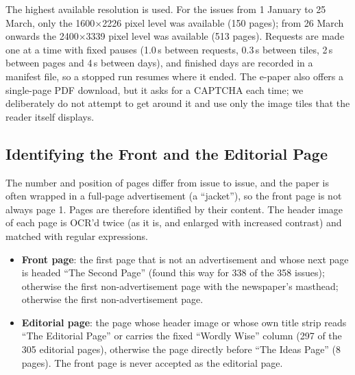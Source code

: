The highest available resolution is used. For the issues from 1 January to 25 March, only the 1600$\times$2226 pixel level was available (150 pages); from 26 March onwards the 2400$\times$3339 pixel level was available (513 pages). Requests are made one at a time with fixed pauses (1.0\,s between requests, 0.3\,s between tiles, 2\,s between pages and 4\,s between days), and finished days are recorded in a manifest file, so a stopped run resumes where it ended. The e-paper also offers a single-page PDF download, but it asks for a CAPTCHA each time; we deliberately do not attempt to get around it and use only the image tiles that the reader itself displays.

\subsection{Identifying the Front and the Editorial Page}
The number and position of pages differ from issue to issue, and the paper is often wrapped in a full-page advertisement (a ``jacket''), so the front page is not always page 1. Pages are therefore identified by their content. The header image of each page is OCR'd twice (as it is, and enlarged with increased contrast) and matched with regular expressions.
\begin{itemize}
\item \textbf{Front page}: the first page that is not an advertisement and whose next page is headed ``The Second Page'' (found this way for 338 of the 358 issues); otherwise the first non-advertisement page with the newspaper's masthead; otherwise the first non-advertisement page.
\item \textbf{Editorial page}: the page whose header image or whose own title strip reads ``The Editorial Page'' or carries the fixed ``Wordly Wise'' column (297 of the 305 editorial pages), otherwise the page directly before ``The Ideas Page'' (8 pages). The front page is never accepted as the editorial page.
\end{itemize}

